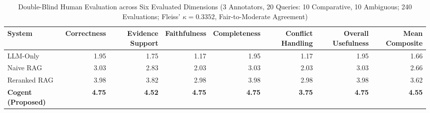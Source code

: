 \begin{table}[!t]
\centering
\caption{Double-Blind Human Evaluation across Six Evaluated Dimensions (3 Annotators, 20 Queries: 10 Comparative, 10 Ambiguous; 240 Evaluations; Fleiss' $\kappa = 0.3352$, Fair-to-Moderate Agreement)}
\label{tab:human_eval}
\begin{tabular}{lrrrrrrr}
\toprule
System & Correctness & Evidence Support & Faithfulness & Completeness & Conflict Handling & Overall Usefulness & Mean Composite \\
\midrule
LLM-Only & 1.95 & 1.75 & 1.17 & 1.95 & 1.17 & 1.95 & 1.66 \\
Naive RAG & 3.03 & 2.83 & 2.03 & 3.03 & 2.03 & 3.03 & 2.66 \\
Reranked RAG & 3.98 & 3.82 & 2.98 & 3.98 & 2.98 & 3.98 & 3.62 \\
\textbf{Cogent (Proposed)} & \textbf{4.75} & \textbf{4.52} & \textbf{4.75} & \textbf{4.75} & \textbf{3.75} & \textbf{4.75} & \textbf{4.55} \\
\bottomrule
\end{tabular}
\end{table}
